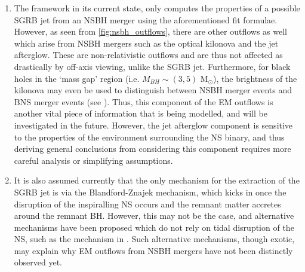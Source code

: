 \begin{enumerate}
            \item The framework in its current state, only computes the properties of
                a possible SGRB jet from an NSBH merger using the aforementioned fit
                formulae. However, as seen from \ref{fig:nsbh_outflows}, there are other
                outflows as well which arise from NSBH mergers such as the optical
                kilonova and the jet afterglow. These are non-relativistic outflows and
                are thus not affected as drastically by off-axis viewing, unlike the
                SGRB jet. Furthermore, for black holes in the `mass gap' region (i.e.
                $M_{BH} \sim (3, 5)$ M$_\odot$), the brightness of the kilonova may even
                be used to distinguish between NSBH merger events and BNS merger events
                (see \cite{barbieri_2019b}). Thus, this component of the EM outflows is
                another vital piece of information that is being modelled, and will be
                investigated in the future. However, the jet afterglow component is
                sensitive to the properties of the environment surrounding the NS
                binary, and thus deriving general conclusions from considering this
                component requires more careful analysis or simplifying assumptions.

            \item It is also assumed currently that the only mechanism for the
                extraction of the SGRB jet is via the Blandford-Znajek mechanism, which
                kicks in once the disruption of the inspiralling NS occurs and the
                remnant matter accretes around the remnant BH. However, this may not be
                the case, and alternative mechanisms have been proposed which do not
                rely on tidal disruption of the NS, such as the mechanism in
                \cite{east_2021}. Such alternative mechanisms, though exotic, may
                explain why EM outflows from NSBH mergers have not been distinctly
                observed yet.


\end{enumerate}
